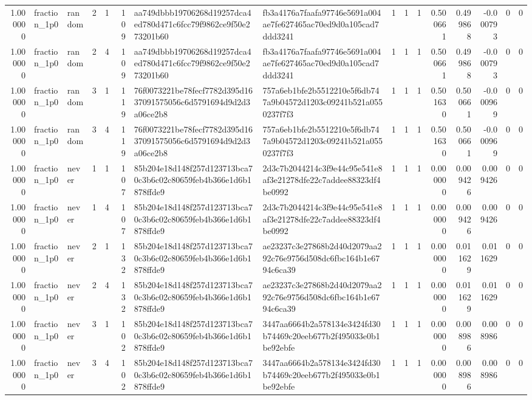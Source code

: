 \begin{tabular}{rllrrrllrrrrrrrr}
1.000000 & fraction\_1p0 & random & 2 & 1 & 109 & aa749dbbb19706268d19257dca4ed780d471c6fcc79f9862ce9f50e273201b60 & fb3a4176a7faafa97746e5691a004ae7fe627465ac70ed9d0a105cad7ddd3241 & 1 & 1 & 1 & 0.500661 & 0.499868 & -0.000793 & 0 & 0 \\
1.000000 & fraction\_1p0 & random & 2 & 4 & 109 & aa749dbbb19706268d19257dca4ed780d471c6fcc79f9862ce9f50e273201b60 & fb3a4176a7faafa97746e5691a004ae7fe627465ac70ed9d0a105cad7ddd3241 & 1 & 1 & 1 & 0.500661 & 0.499868 & -0.000793 & 0 & 0 \\
1.000000 & fraction\_1p0 & random & 3 & 1 & 119 & 76f0073221be78fecf7782d395d1637091575056c6d5791694d9d2d3a06ce2b8 & 757a6eb1bfe2b5512210e5f6db747a9b04572d1203c09241b521a0550237f7f3 & 1 & 1 & 1 & 0.501630 & 0.500661 & -0.000969 & 0 & 0 \\
1.000000 & fraction\_1p0 & random & 3 & 4 & 119 & 76f0073221be78fecf7782d395d1637091575056c6d5791694d9d2d3a06ce2b8 & 757a6eb1bfe2b5512210e5f6db747a9b04572d1203c09241b521a0550237f7f3 & 1 & 1 & 1 & 0.501630 & 0.500661 & -0.000969 & 0 & 0 \\
1.000000 & fraction\_1p0 & never & 1 & 1 & 107 & 85b204e18d148f257d123713bca70c3b6c02c80659feb4b366e1d6b1878ffde9 & 2d3c7b2044214c3f9e44c95e541e8af3e21278dfe22c7addee88323df4be0992 & 1 & 1 & 1 & 0.000000 & 0.009426 & 0.009426 & 0 & 0 \\
1.000000 & fraction\_1p0 & never & 1 & 4 & 107 & 85b204e18d148f257d123713bca70c3b6c02c80659feb4b366e1d6b1878ffde9 & 2d3c7b2044214c3f9e44c95e541e8af3e21278dfe22c7addee88323df4be0992 & 1 & 1 & 1 & 0.000000 & 0.009426 & 0.009426 & 0 & 0 \\
1.000000 & fraction\_1p0 & never & 2 & 1 & 132 & 85b204e18d148f257d123713bca70c3b6c02c80659feb4b366e1d6b1878ffde9 & ae23237c3e27868b2d40d2079aa292c76e9756d508dc6fbc164b1e6794c6ca39 & 1 & 1 & 1 & 0.000000 & 0.011629 & 0.011629 & 0 & 0 \\
1.000000 & fraction\_1p0 & never & 2 & 4 & 132 & 85b204e18d148f257d123713bca70c3b6c02c80659feb4b366e1d6b1878ffde9 & ae23237c3e27868b2d40d2079aa292c76e9756d508dc6fbc164b1e6794c6ca39 & 1 & 1 & 1 & 0.000000 & 0.011629 & 0.011629 & 0 & 0 \\
1.000000 & fraction\_1p0 & never & 3 & 1 & 102 & 85b204e18d148f257d123713bca70c3b6c02c80659feb4b366e1d6b1878ffde9 & 3447aa6664b2a578134e3424fd30b74469c20eeb677b2f495033e0b1be92ebfe & 1 & 1 & 1 & 0.000000 & 0.008986 & 0.008986 & 0 & 0 \\
1.000000 & fraction\_1p0 & never & 3 & 4 & 102 & 85b204e18d148f257d123713bca70c3b6c02c80659feb4b366e1d6b1878ffde9 & 3447aa6664b2a578134e3424fd30b74469c20eeb677b2f495033e0b1be92ebfe & 1 & 1 & 1 & 0.000000 & 0.008986 & 0.008986 & 0 & 0 \\
\bottomrule
\end{tabular}
